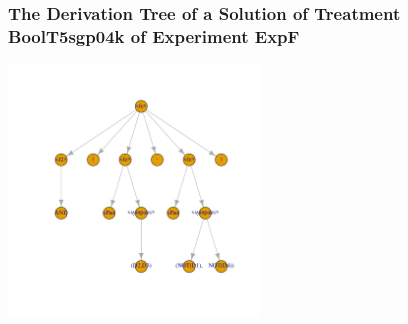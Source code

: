  \begin{frame}
 \frametitle{ The Derivation Tree of a Solution of Treatment BoolT5sgp04k of Experiment ExpF }
 \begin{center}
\includegraphics[width=0.5\textwidth, angle=0]
{ExpFDerivationTreeFigure002.pdf}
 \end{center}
 \label{report/ExpFDerivationTreeFigure002.pdf}  
 \end{frame}

